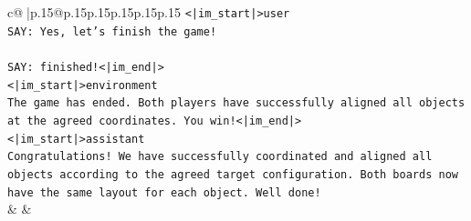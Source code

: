 \documentclass{article}
\begin{document}
{\begin{supertabular}{c@{$\;$}|p{.15\linewidth}@{}p{.15\linewidth}p{.15\linewidth}p{.15\linewidth}p{.15\linewidth}p{.15\linewidth}}
{{{\texttt{<|im\_start|>user} \\
\texttt{SAY: Yes, let's finish the game!} \\
\\ 
\texttt{SAY: finished!<|im\_end|>} \\
\texttt{<|im\_start|>environment} \\
\texttt{The game has ended. Both players have successfully aligned all objects at the agreed coordinates. You win!<|im\_end|>} \\
\texttt{<|im\_start|>assistant} \\
\texttt{Congratulations! We have successfully coordinated and aligned all objects according to the agreed target configuration. Both boards now have the same layout for each object. Well done!} \\
            }
        }
    }
    & & \\ \\


\end{supertabular}}
\end{document}
